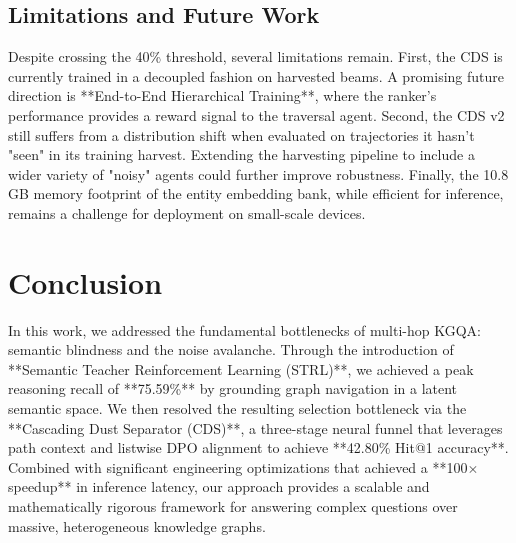 \documentclass[11pt,a4paper]{article}
\begin{document}
\subsection{Limitations and Future Work}
Despite crossing the 40\% threshold, several limitations remain. 
First, the CDS is currently trained in a decoupled fashion on harvested beams.
A promising future direction is **End-to-End Hierarchical Training**, where the
ranker's performance provides a reward signal to the traversal agent.
Second, the CDS v2 still suffers from a distribution shift when evaluated on
trajectories it hasn't "seen" in its training harvest. 
Extending the harvesting pipeline to include a wider variety of "noisy"
agents could further improve robustness.
Finally, the 10.8\,GB memory footprint of the entity embedding bank, while
efficient for inference, remains a challenge for deployment on small-scale
devices.

\section{Conclusion}
\label{sec:conclusion}
In this work, we addressed the fundamental bottlenecks of multi-hop KGQA:
semantic blindness and the noise avalanche. 
Through the introduction of **Semantic Teacher Reinforcement Learning (STRL)**,
we achieved a peak reasoning recall of **75.59\%** by grounding graph
navigation in a latent semantic space. 
We then resolved the resulting selection bottleneck via the **Cascading Dust
Separator (CDS)**, a three-stage neural funnel that leverages path context
and listwise DPO alignment to achieve **42.80\% Hit@1 accuracy**.
Combined with significant engineering optimizations that achieved a
**100$\times$ speedup** in inference latency, our approach provides a
scalable and mathematically rigorous framework for answering complex
questions over massive, heterogeneous knowledge graphs.
\end{document}
